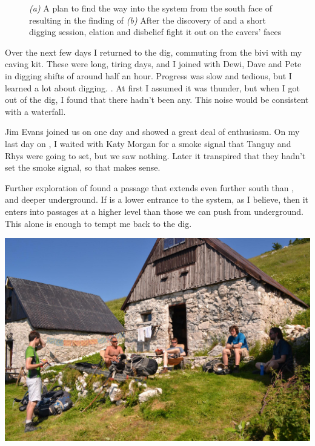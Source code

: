 \begin{figure}[t!]
        \caption{
            \textsl{(a)} A plan to find the way into the system from the south face of  resulting in the finding of  
            \textsl{(b)} After the discovery of  and a short digging session, elation and disbelief fight it out on the cavers' faces }
        \label{}

    \end{figure}

	Over the next few days I returned to the dig, commuting from the bivi with my caving kit. These were long, tiring days, and I joined with Dewi, Dave and Pete in digging shifts of around half an hour. Progress was slow and tedious, but I learned a lot about digging. . At first I assumed it was thunder, but when I got out of the dig, I found that there hadn't been any. This noise would be consistent with a waterfall.

    Jim Evans joined us on one day and showed a great deal of enthusiasm. On my last day on , I waited with Katy Morgan for a smoke signal that Tanguy and Rhys were going to set, but we saw nothing. Later it transpired that they hadn't set the smoke signal, so that makes sense.

    Further exploration of  found a passage that extends even further south than , and deeper underground. If  is a lower entrance to the system, as I believe, then it enters into passages at a higher level than those we can push from underground. This alone is enough to tempt me back to the dig.

 \begin{pagefigure}
 \includegraphics[width = \textwidth]{images/2015/jack-coincidence-2015/rhys_to_from_kal.jpg} 
 \caption{Jack Hare, Tetley, Benjamin Honan, Oliver Myerscough and Chris Keeley rest at \protect{}  before the final ascent to the \protect{}} \label{fig: at kal}
\end{pagefigure}